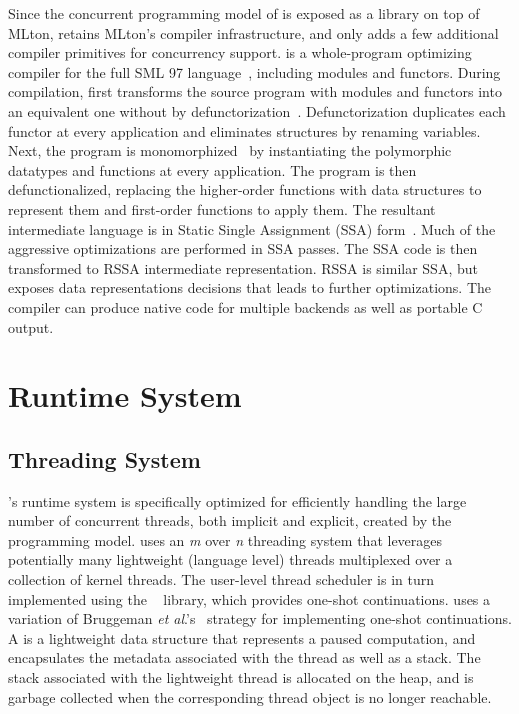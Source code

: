 Since the concurrent programming model of \MM is exposed as a library on top of
MLton, \MM retains MLton's compiler infrastructure, and only adds a few
additional compiler primitives for concurrency support. \MM is a whole-program
optimizing compiler for the full SML 97 language~\cite{SML97}, including
modules and functors. During compilation, \MM first transforms the source
program with modules and functors into an equivalent one without by
defunctorization~\cite{ElsmanPhD}. Defunctorization duplicates each functor at
every application and eliminates structures by renaming variables. Next, the
program is monomorphized~\cite{Reynolds1972} by instantiating the polymorphic
datatypes and functions at every application. The program is then
defunctionalized, replacing the higher-order functions with data structures to
represent them and first-order functions to apply them. The resultant
intermediate language is in Static Single Assignment (SSA)
form~\cite{Bilardi2003}. Much of the aggressive optimizations are performed in
SSA passes. The SSA code is then transformed to RSSA intermediate
representation. RSSA is similar SSA, but exposes data representations decisions
that leads to further optimizations. The compiler can produce native code for
multiple backends as well as portable C output.

\section{Runtime System}

\subsection{Threading System}

\MM's runtime system is specifically optimized for efficiently handling the
large number of concurrent threads, both implicit and explicit, created by the
\acml programming model. \MM uses an {\em m} over {\em n} threading system that
leverages potentially many lightweight (language level) threads multiplexed
over a collection of kernel threads. The user-level thread scheduler is in turn
implemented using the ~\cite{MLton} library, which provides
one-shot continuations.  uses a variation of Bruggeman
\emph{et al}.'s~\cite{Bruggeman1996} strategy for implementing one-shot
continuations. A  is a lightweight data structure that
represents a paused computation, and encapsulates the metadata associated with
the thread as well as a stack. The stack associated with the lightweight thread
is allocated on the heap, and is garbage collected when the corresponding
thread object is no longer reachable.

